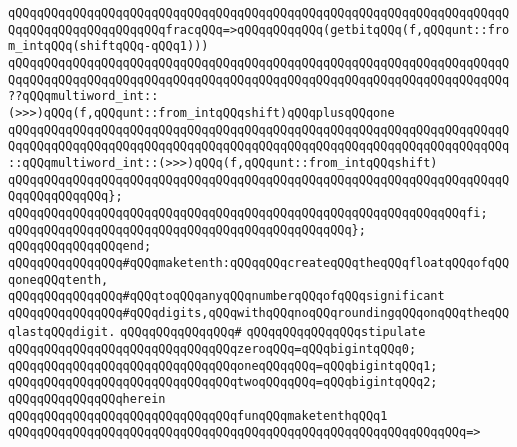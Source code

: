 \newline
\verb|qQQqqQQqqQQqqQQqqQQqqQQqqQQqqQQqqQQqqQQqqQQqqQQqqQQqqQQqqQQqqQQqqQQqqQQqqQQqqQQqqQQqqQQqqQQqfracqQQq=>qQQqqQQqqQQq(getbitqQQq(f,qQQqunt::from_intqQQq(shiftqQQq-qQQq1)))|\newline
\verb|qQQqqQQqqQQqqQQqqQQqqQQqqQQqqQQqqQQqqQQqqQQqqQQqqQQqqQQqqQQqqQQqqQQqqQQqqQQqqQQqqQQqqQQqqQQqqQQqqQQqqQQqqQQqqQQqqQQqqQQqqQQqqQQqqQQqqQQqqQQq??qQQqmultiword_int::(>>>)qQQq(f,qQQqunt::from_intqQQqshift)qQQqplusqQQqone|\newline
\verb|qQQqqQQqqQQqqQQqqQQqqQQqqQQqqQQqqQQqqQQqqQQqqQQqqQQqqQQqqQQqqQQqqQQqqQQqqQQqqQQqqQQqqQQqqQQqqQQqqQQqqQQqqQQqqQQqqQQqqQQqqQQqqQQqqQQqqQQqqQQq::qQQqmultiword_int::(>>>)qQQq(f,qQQqunt::from_intqQQqshift)|\newline
\verb|qQQqqQQqqQQqqQQqqQQqqQQqqQQqqQQqqQQqqQQqqQQqqQQqqQQqqQQqqQQqqQQqqQQqqQQqqQQqqQQqqQQq};|\newline
\verb|qQQqqQQqqQQqqQQqqQQqqQQqqQQqqQQqqQQqqQQqqQQqqQQqqQQqqQQqqQQqqQQqfi;|\newline
\verb|qQQqqQQqqQQqqQQqqQQqqQQqqQQqqQQqqQQqqQQqqQQqqQQq};|\newline
\verb|qQQqqQQqqQQqqQQqend;|\newline
\newline
\verb|qQQqqQQqqQQqqQQq#qQQqmaketenth:qQQqqQQqcreateqQQqtheqQQqfloatqQQqofqQQqoneqQQqtenth,|\newline
\verb|qQQqqQQqqQQqqQQq#qQQqtoqQQqanyqQQqnumberqQQqofqQQqsignificant|\newline
\verb|qQQqqQQqqQQqqQQq#qQQqdigits,qQQqwithqQQqnoqQQqroundingqQQqonqQQqtheqQQqlastqQQqdigit.|\newline
\verb|qQQqqQQqqQQqqQQq#|\newline
\verb|qQQqqQQqqQQqqQQqstipulate|\newline
\newline
\verb|qQQqqQQqqQQqqQQqqQQqqQQqqQQqqQQqzeroqQQq=qQQqbigintqQQq0;|\newline
\verb|qQQqqQQqqQQqqQQqqQQqqQQqqQQqqQQqoneqQQqqQQq=qQQqbigintqQQq1;|\newline
\verb|qQQqqQQqqQQqqQQqqQQqqQQqqQQqqQQqtwoqQQqqQQq=qQQqbigintqQQq2;|\newline
\newline
\verb|qQQqqQQqqQQqqQQqherein|\newline
\newline
\verb|qQQqqQQqqQQqqQQqqQQqqQQqqQQqqQQqfunqQQqmaketenthqQQq1|\newline
\verb|qQQqqQQqqQQqqQQqqQQqqQQqqQQqqQQqqQQqqQQqqQQqqQQqqQQqqQQqqQQqqQQq=>|\newline
